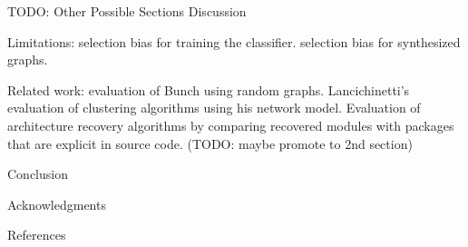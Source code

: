 \documentclass[11pt,twocolumn,a4paper,english]{article}
\begin{document}

\begin{section}{TODO: Other Possible Sections}
	Discussion
	
	Limitations: selection bias for training the classifier. selection bias for synthesized graphs.
	
	Related work: evaluation of Bunch using random graphs. Lancichinetti's evaluation of clustering algorithms using his network model. Evaluation of architecture recovery algorithms by comparing recovered modules with packages that are explicit in source code. (TODO: maybe promote to 2nd section)
	
	Conclusion
	
	Acknowledgments
	
	References	
\end{section}




\end{document}
